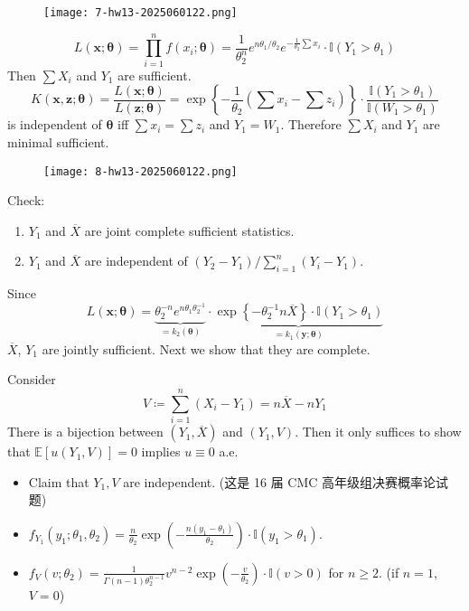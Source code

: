 \begin{exercise}
\begin{figure}[H]
\centering
\texttt{[image: 7-hw13-2025060122.png]}
\label{}
\end{figure}
\end{exercise}
\[
L(\mathbf{x};\boldsymbol{\theta})=\prod_{i=1}^{n} f(x_i;\boldsymbol{\theta})=\frac{1}{\theta_2^{n}}e^{ n\theta_1/\theta_2 }e^{ -\frac{1}{\theta_2} \sum x_i}\cdot \mathbb{I}(Y_1>\theta_1)
\]
Then $\sum X_i$ and $Y_1$ are sufficient.
\[
K(\mathbf{x},\mathbf{z};\boldsymbol{\theta})=\frac{L(\mathbf{x};\boldsymbol{\theta})}{L(\mathbf{z};\boldsymbol{\theta})}=\exp \left\{  -\frac{1}{\theta_2}\left( \sum x_i-\sum z_i \right)  \right\}\cdot\frac{\mathbb{I}(Y_1>\theta_1)}{\mathbb{I}(W_1>\theta_1)}
\]
is independent of $\boldsymbol{\theta}$ iff $\sum x_i=\sum z_i$ and $Y_1=W_1$. Therefore $\sum X_i$ and $Y_1$ are minimal sufficient.

\begin{exercise}
\begin{figure}[H]
\centering
\texttt{[image: 8-hw13-2025060122.png]}
\label{}
\end{figure}
\end{exercise}
Check:

\begin{enumerate}
	\item $Y_1$ and $\overline{X}$ are joint complete sufficient statistics.
	\item $Y_1$ and $\overline{X}$ are independent of $(Y_2-Y_1)/\sum_{i=1}^{n}(Y_i-Y_1)$.
\end{enumerate}

Since
\[
L(\mathbf{x};\boldsymbol{\theta})=\underbrace{ \theta_2^{-n}e^{ n\theta_1\theta_2 ^{-1} } }_{ =k_2(\boldsymbol{\theta}) }\cdot\underbrace{ \exp \left\{  -\theta_2^{-1}n\overline{X}  \right\}\cdot \mathbb{I}(Y_1>\theta_1) }_{ =k_1(\mathbf{y};\boldsymbol{\theta}) }
\]
$\overline{X}$, $Y_1$ are jointly sufficient. Next we show that they are complete.

Consider
\[
V\coloneqq \sum_{i=1}^{n} (X_i-Y_1)=n\overline{X}-nY_1
\]
There is a bijection between $(Y_1,\overline{X})$ and $(Y_1,V)$. Then it only suffices to show that $\mathbb{E}[u(Y_1,V)]=0$ implies $u\equiv0$ a.e.

\begin{itemize}
	\item Claim that $Y_1, V$ are independent. (这是 16 届 CMC 高年级组决赛概率论试题)
	\item $f_{Y_1}(y_1;\theta_1,\theta_2)=\frac{n}{\theta_2}\exp\left( -\frac{n(y_1-\theta_1)}{\theta_2} \right)\cdot \mathbb{I}(y_1>\theta_1)$.
	\item $f_{V}(v;\theta_2)=\frac{1}{\Gamma(n-1)\theta_2^{n-1}}v^{n-2}\exp\left( -\frac{v}{\theta_2} \right)\cdot \mathbb{I}(v>0)$ for $n\geq2$. (if $n=1$, $V=0$)
\end{itemize}

